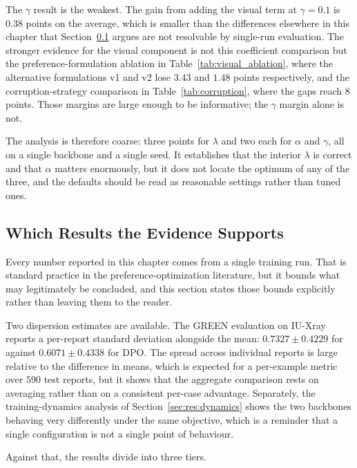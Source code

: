 The $\gamma$ result is the weakest. The gain from adding the visual term at $\gamma = 0.1$ is $0.38$ points on the average, which is smaller than the differences elsewhere in this chapter that Section~\ref{sec:res:variance} argues are not resolvable by single-run evaluation. The stronger evidence for the visual component is not this coefficient comparison but the preference-formulation ablation in Table~\ref{tab:visual_ablation}, where the alternative formulations v1 and v2 lose $3.43$ and $1.48$ points respectively, and the corruption-strategy comparison in Table~\ref{tab:corruption}, where the gaps reach $8$ points. Those margins are large enough to be informative; the $\gamma$ margin alone is not.

The analysis is therefore coarse: three points for $\lambda$ and two each for $\alpha$ and $\gamma$, all on a single backbone and a single seed. It establishes that the interior $\lambda$ is correct and that $\alpha$ matters enormously, but it does not locate the optimum of any of the three, and the defaults should be read as reasonable settings rather than tuned ones.

\subsection{Which Results the Evidence Supports}
\label{sec:res:variance}

Every number reported in this chapter comes from a single training run. That is standard practice in the preference-optimization literature, but it bounds what may legitimately be concluded, and this section states those bounds explicitly rather than leaving them to the reader.

Two dispersion estimates are available. The GREEN evaluation on IU-Xray reports a per-report standard deviation alongside the mean: $0.7327 \pm 0.4229$ for \ourloss{} against $0.6071 \pm 0.4338$ for DPO. The spread across individual reports is large relative to the difference in means, which is expected for a per-example metric over $590$ test reports, but it shows that the aggregate comparison rests on averaging rather than on a consistent per-case advantage. Separately, the training-dynamics analysis of Section~\ref{sec:res:dynamics} shows the two backbones behaving very differently under the same objective, which is a reminder that a single configuration is not a single point of behaviour.

Against that, the results divide into three tiers.


